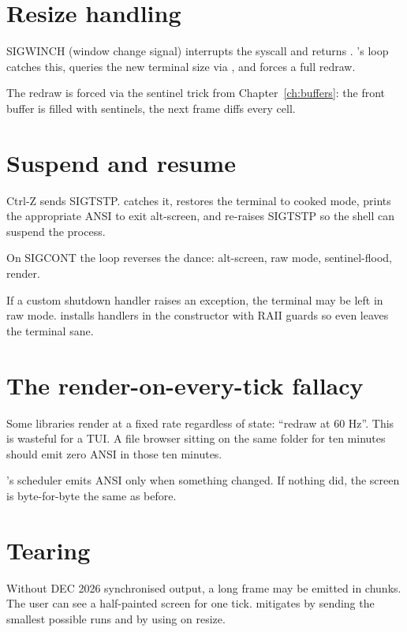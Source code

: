 \section{Resize handling}

SIGWINCH (window change signal) interrupts the syscall and
returns . \maya{}'s loop catches this, queries the
new terminal size via , and forces a full
redraw.

The redraw is forced via the sentinel trick from
Chapter~\ref{ch:buffers}: the front buffer is filled with sentinels,
the next frame diffs every cell.

\section{Suspend and resume}

Ctrl-Z sends SIGTSTP. \maya{} catches it, restores the terminal
to cooked mode, prints the appropriate ANSI to exit alt-screen,
and re-raises SIGTSTP so the shell can suspend the process.

On SIGCONT the loop reverses the dance: alt-screen, raw mode,
sentinel-flood, render.

\begin{warning}
If a custom shutdown handler raises an exception, the terminal
may be left in raw mode. \maya{} installs handlers in the
constructor with RAII guards so even 
leaves the terminal sane.
\end{warning}

\section{The render-on-every-tick fallacy}

Some libraries render at a fixed rate regardless of state:
``redraw at 60 Hz''. This is wasteful for a TUI. A file
browser sitting on the same folder for ten minutes should
emit zero ANSI in those ten minutes.

\maya{}'s scheduler emits ANSI only when something changed. If
nothing did, the screen is byte-for-byte the same as before.

\section{Tearing}

Without DEC 2026 synchronised output, a long frame may be
emitted in chunks. The user can see a half-painted screen for
one tick. \maya{} mitigates by sending the smallest possible
runs and by using  on resize.

